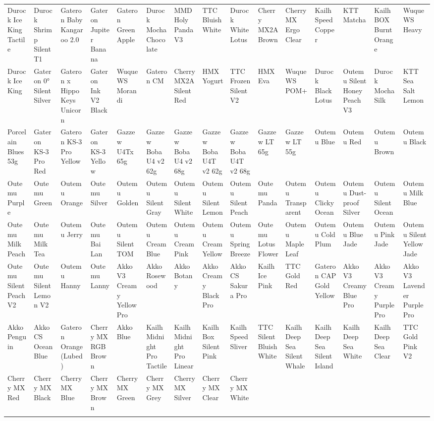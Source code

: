 \documentclass[a4paper]{article}
\begin{document}
\pagestyle{empty}
\begin{center}
\fontsize{7}{9}\selectfont
{\selectfont
\begin{tabular}{ : *{15}{C{1.2cm}:} }
\hdashline
Durock Ice King Tactile & Durock Shrimp Silent T1 & Gateron Baby Kangaroo 2.0 & Gateron Jupiter Banana & Gateron Green Apple & Durock Mocha Chocolate & MMD Holy Panda V3 & TTC Bluish White & Durock White Lotus & Cherry MX2A Brown & Cherry MX Ergo Clear & Kailh Speed Copper & KTT Matcha & Kailh BOX Burnt Orange & Wuque WS Heavy \\ 
\hdashline
Durock Ice King & Gateron 0° Silent Silver & Gateron x HippoKeys Unicorn & Gateron Ink V2 Black & Wuque WS Morandi & Gateron CM & Cherry MX2A Silent Red & HMX Yogurt & TTC Frozen Silent V2 & HMX Eva & Wuque WS POM+ & Durock Black Lotus & Outemu Silent Honey Peach V3 & Durock Mocha Silk & KTT Sea Salt Lemon \\ 
\hdashline
Porcelain Blues 53g & Gateron KS-3 Pro Red & Gateron KS-3 Pro Yellow & Gateron KS-3 Yellow & Gazzew U4Tx 65g & Gazzew Boba U4 v2 62g & Gazzew Boba U4 v2 68g & Gazzew Boba U4T v2 62g & Gazzew Boba U4T v2 68g & Gazzew LT 65g & Gazzew LT 55g & Outemu Blue & Outemu Red & Outemu Brown & Outemu Black \\ 
\hdashline
Outemu Purple & Outemu Green & Outemu Orange & Outemu Silver & Outemu Golden & Outemu Silent Gray & Outemu Silent White & Outemu Silent Lemon & Outemu Silent Peach & Outemu Panda & Outemu Transparent & Outemu Clicky Ocean & Outemu Dust-proof Silver & Outemu Silent Ocean & Outemu Milk Blue \\ 
\hdashline
Outemu Milk Peach & Outemu Milk Tea & Outemu Jerry & Outemu Bai Lan & Outemu Silent TOM & Outemu Cream Blue & Outemu Cream Pink & Outemu Cream Yellow & Outemu Spring Breeze & Outemu Lotus Flower & Outemu Maple Leaf & Outemu Cold Plum & Outemu Blue Jade & Outemu Pink Jade & Outemu Silent Yellow Jade \\ 
\hdashline
Outemu Silent Peach V2 & Outemu Silent Lemon V2 & Outemu Hanny & Outemu Lanny & Akko V3 Creamy Yellow Pro & Akko Rosewood & Akko Botany & Akko Creamy Black Pro & Akko CS Sakura Pro & Kailh Ice Pink & TTC Gold Red & Gateron CAP Gold Yellow & Akko V3 Creamy Blue Pro & Akko V3 Creamy Purple Pro & Akko V3 Lavender Purple Pro \\ 
\hdashline
Akko Penguin & Akko CS Ocean Blue & Gateron Orange (Lubed) & Cherry MX RGB Brown & Akko Blue & Kailh Midnight Pro Tactile & Kailh Midnight Pro Linear & Kailh Box Silent Pink & Kailh Speed Sliver & TTC Silent Bluish White & Kailh Deep Sea Silent Whale & Kailh Deep Sea Silent Island & Kailh Deep Sea White & Kailh Deep Sea Clear & TTC Gold Pink V2 \\ 
\hdashline
Cherry MX Red & Cherry MX Black & Cherry MX Blue & Cherry MX Brown & Cherry MX Green & Cherry MX Grey & Cherry MX Silver & Cherry MX Clear & Cherry MX White &  &  &  &  &  &  \\ 
\hdashline
\end{tabular}
}
\end{center}
\end{document}
